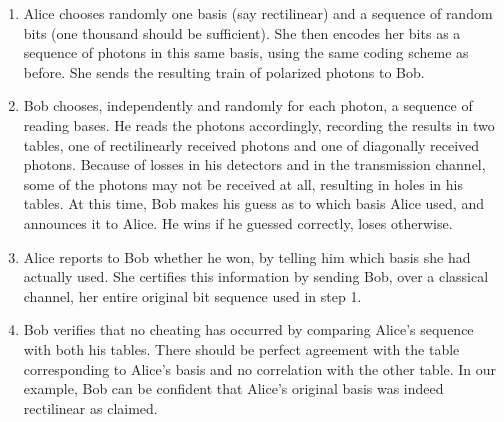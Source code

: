 \begin{enumerate}
    \item Alice chooses randomly one basis (say rectilinear) and a sequence of random bits (one thousand should be sufficient). She then encodes her bits as a sequence of photons in this same basis, using the same coding scheme as before. She sends the resulting train of polarized photons to Bob.
    \item Bob chooses, independently and randomly for each photon, a sequence of reading bases. He reads the photons accordingly, recording the results in two tables, one of rectilinearly received photons and one of diagonally received photons. Because of losses in his detectors and in the transmission channel, some of the photons may not be received at all, resulting in holes in his tables. At this time, Bob makes his guess as to which basis Alice used, and announces it to Alice. He wins if he guessed correctly, loses otherwise.
    \item Alice reports to Bob whether he won, by telling him which basis she had actually used. She certifies this information by sending Bob, over a classical channel, her entire original bit sequence used in step 1.
    \item Bob verifies that no cheating has occurred by comparing Alice’s sequence with both his tables. There should be perfect agreement with the table corresponding to Alice’s basis and no correlation with the other table. In our example, Bob can be confident that Alice’s original basis was indeed rectilinear as claimed.
\end{enumerate}
